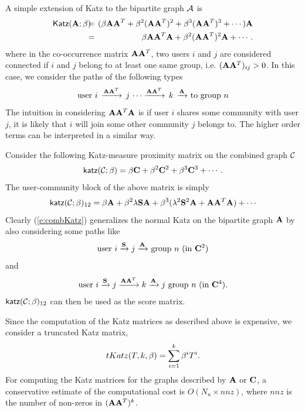 \documentclass{sig-alternate}
\begin{document}
A simple extension of \textsf{Katz} to the bipartite graph $\mathcal{A}$ is
\begin{eqnarray}
\textsf{Katz}(\A; \beta) \hspace{-6pt} &= & \hspace{-6pt}(\beta \A\A^T + \beta^2 (\A\A^T)^2 + \beta^3 (\A\A^T)^3 + \cdots) \A \nonumber \\
\hspace{-6pt} &= & \hspace{-6pt} \beta \A\A^T\A + \beta^2 (\A\A^T)^2\A + \cdots.
\label{e:extKatz}
\end{eqnarray}
where in the co-occurrence matrix $\mathbf{A}\mathbf{A}^T$, two users $i$ and $j$ are considered connected if $i$ and $j$ belong to at least one same group, i.e. $(\mathbf{A}\mathbf{A}^T)_{ij} > 0$. In this case, we consider the paths of the following types
\[
\text{user $i \, \xrightarrow{\mathbf{A}\mathbf{A}^T}\, j \,\cdots \xrightarrow{\mathbf{A}\mathbf{A}^T}\, k \,  \xrightarrow{\mathbf{A}}$ to group $n$}
\]
The intuition in considering $\mathbf{A}\mathbf{A}^T\mathbf{A}$ is if user $i$ shares some community with user $j$, it is likely that $i$ will join some other community $j$ belongs to. The higher order terms can be interpreted in a similar way.

Consider the following Katz-measure proximity matrix on the combined graph $\mathcal{C}$
\[
\mathsf{katz}(\mathcal{C}; \beta) = \beta \mathbf{C} + \beta^2 \mathbf{C}^2 + \beta^3 \mathbf{C}^3 + \cdots.
\]
The user-community block of the above matrix is simply
\begin{equation}
\mathsf{katz}(\calC; \beta)_{12} = \beta \A + \beta^2 \lambda \SS \A +  \beta^3(\lambda^2 \SS^2 \A + \A \A^T \A) + \cdots
\label{e:combKatz}
\end{equation}
Clearly (\ref{e:combKatz}) generalizes the normal Katz on the bipartite graph $\mathbf{A}$
by also considering some paths like
\[
\text{user $i \xrightarrow{\mathbf{S}}j\xrightarrow{\mathbf{A}}$ group $n$ (in $\mathbf{C}^2$)}
\]
and
\[
\text{user $i \xrightarrow{\mathbf{S}}j\xrightarrow{\mathbf{A}\mathbf{A}^T}k \xrightarrow{\mathbf{A}}j$ group $n$ (in $\mathbf{C}^4$)}.
\]
$\mathsf{katz}(\mathcal{C}; \beta)_{12}$ can then be used as the score matrix.

Since the computation of the Katz matrices as described above is expensive, we consider a truncated Katz matrix, $$tKatz(T, k, \beta) = \sum_{i=1}^{k} \beta^i T^i.$$ For computing the Katz matrices for the graphs described by $\mathbf{A}$ or $\mathbf{C}$, a conservative estimate of the computational cost is $O(N_u \times nnz)$, where $nnz$ is the number of non-zeros in $(\mathbf{A}\mathbf{A}^T)^k$.
\end{document}
